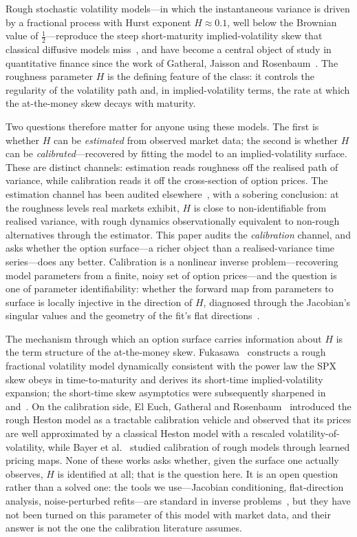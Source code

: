 \documentclass[11pt,a4paper]{article}
\numberwithin{equation}{section}
\begin{document}
Rough stochastic volatility models---in which the instantaneous variance is driven by a
fractional process with Hurst exponent $H\approx 0.1$, well below the Brownian value of
$\tfrac12$---reproduce the steep short-maturity implied-volatility skew that classical
diffusive models miss~\citep{bfg2016}, and have become a central object of study in quantitative finance
since the work of Gatheral, Jaisson and Rosenbaum~\citeyearpar{gjr2018}. The roughness parameter $H$ is the
defining feature of the class: it controls the regularity of the volatility path and, in
implied-volatility terms, the rate at which the at-the-money skew decays with maturity.

Two questions therefore matter for anyone using these models. The first is whether $H$ can
be \emph{estimated} from observed market data; the second is whether $H$ can be
\emph{calibrated}---recovered by fitting the model to an implied-volatility surface. These
are distinct channels: estimation reads roughness off the realised path of variance, while
calibration reads it off the cross-section of option prices. The estimation channel has been
audited elsewhere~\citep{lumor_identifiability}, with a sobering conclusion: at the roughness
levels real markets exhibit,
$H$ is close to non-identifiable from realised variance, with rough dynamics observationally
equivalent to non-rough alternatives through the estimator. This paper audits the
\emph{calibration} channel, and asks whether the option surface---a richer object than a
realised-variance time series---does any better. Calibration is a nonlinear inverse
problem---recovering model parameters from a finite, noisy set of option prices---and the
question is one of parameter identifiability: whether the forward map from parameters to
surface is locally injective in the direction of $H$, diagnosed through the Jacobian's
singular values and the geometry of the fit's flat directions~\citep{kaipio2005}.

The mechanism through which an option surface carries information about $H$ is the term
structure of the at-the-money skew. Fukasawa~\citeyearpar{fukasawa2017} constructs a rough
fractional volatility model dynamically consistent with the power law the SPX skew obeys
in time-to-maturity and derives its short-time implied-volatility expansion; the
short-time skew asymptotics were subsequently sharpened in~\citet{bfghs2019} and~\citet{efgr2019}. On
the calibration side, El Euch, Gatheral and Rosenbaum~\citeyearpar{egr2019} introduced the rough
Heston model as a tractable calibration vehicle and observed that its prices are well
approximated by a classical Heston model with a rescaled volatility-of-volatility, while
Bayer et al.~\citeyearpar{bhmst2019} studied calibration of rough models through learned pricing
maps. None of these works asks whether, given the surface one actually observes, $H$ is
identified at all; that is the question here. It is an open question rather than a solved
one: the tools we use---Jacobian conditioning, flat-direction analysis, noise-perturbed
refits---are standard in inverse problems~\citep{tms2010}, but they have not been turned on this parameter
of this model with market data, and their answer is not the one the calibration literature
assumes.
\end{document}
